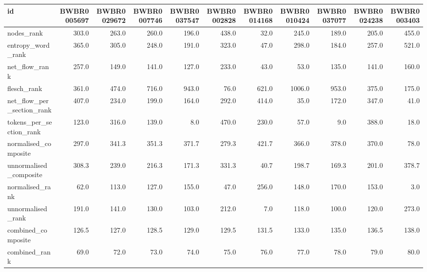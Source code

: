 \begin{tabular}{lrrrrrrrrrr}
\toprule
id & BWBR0005697 & BWBR0029672 & BWBR0007746 & BWBR0037547 & BWBR0002828 & BWBR0014168 & BWBR0010424 & BWBR0037077 & BWBR0024238 & BWBR0003403 \\
\midrule
nodes\_rank & 303.0 & 263.0 & 260.0 & 196.0 & 438.0 & 32.0 & 245.0 & 189.0 & 205.0 & 455.0 \\
\cline{1-11}
entropy\_word\_rank & 365.0 & 305.0 & 248.0 & 191.0 & 323.0 & 47.0 & 298.0 & 184.0 & 257.0 & 521.0 \\
\cline{1-11}
net\_flow\_rank & 257.0 & 149.0 & 141.0 & 127.0 & 233.0 & 43.0 & 53.0 & 135.0 & 141.0 & 160.0 \\
\cline{1-11}
flesch\_rank & 361.0 & 474.0 & 716.0 & 943.0 & 76.0 & 621.0 & 1006.0 & 953.0 & 375.0 & 175.0 \\
\cline{1-11}
net\_flow\_per\_section\_rank & 407.0 & 234.0 & 199.0 & 164.0 & 292.0 & 414.0 & 35.0 & 172.0 & 347.0 & 41.0 \\
\cline{1-11}
tokens\_per\_section\_rank & 123.0 & 316.0 & 139.0 & 8.0 & 470.0 & 230.0 & 57.0 & 9.0 & 388.0 & 18.0 \\
\cline{1-11}
normalised\_composite & 297.0 & 341.3 & 351.3 & 371.7 & 279.3 & 421.7 & 366.0 & 378.0 & 370.0 & 78.0 \\
\cline{1-11}
unnormalised\_composite & 308.3 & 239.0 & 216.3 & 171.3 & 331.3 & 40.7 & 198.7 & 169.3 & 201.0 & 378.7 \\
\cline{1-11}
normalised\_rank & 62.0 & 113.0 & 127.0 & 155.0 & 47.0 & 256.0 & 148.0 & 170.0 & 153.0 & 3.0 \\
\cline{1-11}
unnormalised\_rank & 191.0 & 141.0 & 130.0 & 103.0 & 212.0 & 7.0 & 118.0 & 100.0 & 120.0 & 273.0 \\
\cline{1-11}
combined\_composite & 126.5 & 127.0 & 128.5 & 129.0 & 129.5 & 131.5 & 133.0 & 135.0 & 136.5 & 138.0 \\
\cline{1-11}
combined\_rank & 69.0 & 72.0 & 73.0 & 74.0 & 75.0 & 76.0 & 77.0 & 78.0 & 79.0 & 80.0 \\
\cline{1-11}
\bottomrule
\end{tabular}
